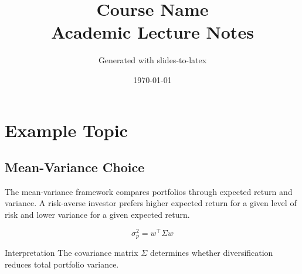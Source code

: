 \documentclass[11pt, a4paper]{article}
\title{
  Course Name\\[0.3em]
  {\normalsize Academic Lecture Notes}
}
\author{Generated with slides-to-latex}
\date{\today}
\begin{document}
\maketitle
\tableofcontents
\newpage

\section{Example Topic}

\subsection*{Mean-Variance Choice}
The mean-variance framework compares portfolios through expected return and
variance. A risk-averse investor prefers higher expected return for a given
level of risk and lower variance for a given expected return.

\begin{equation}
  \sigma_p^2 = w^\top \Sigma w
\end{equation}

\begin{conceptbox}{Interpretation}
  The covariance matrix $\Sigma$ determines whether diversification reduces
  total portfolio variance.
\end{conceptbox}

\end{document}
